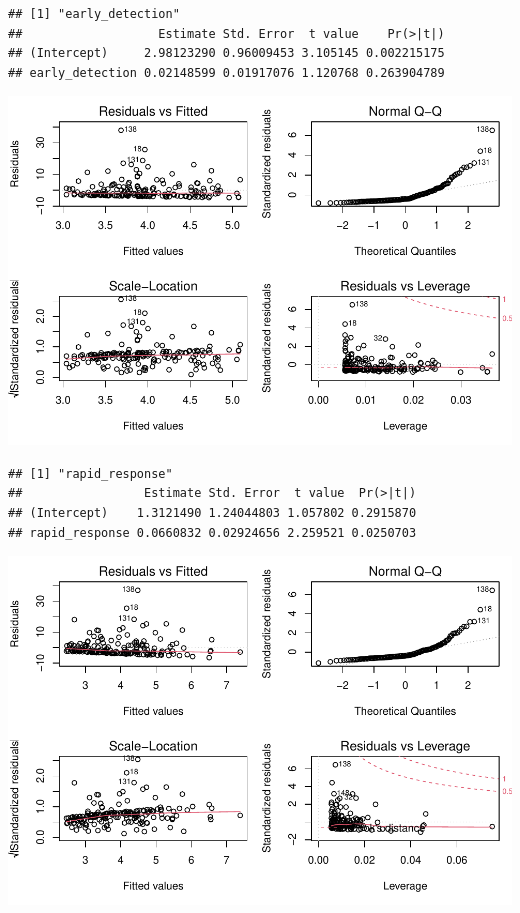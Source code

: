\documentclass[
]{article}
\begin{document}
\begin{verbatim}
## [1] "early_detection"
##                   Estimate Std. Error  t value    Pr(>|t|)
## (Intercept)     2.98123290 0.96009453 3.105145 0.002215175
## early_detection 0.02148599 0.01917076 1.120768 0.263904789
\end{verbatim}

\includegraphics{Basic-Regression_files/figure-latex/unnamed-chunk-4-2.pdf}

\begin{verbatim}
## [1] "rapid_response"
##                 Estimate Std. Error  t value  Pr(>|t|)
## (Intercept)    1.3121490 1.24044803 1.057802 0.2915870
## rapid_response 0.0660832 0.02924656 2.259521 0.0250703
\end{verbatim}

\includegraphics{Basic-Regression_files/figure-latex/unnamed-chunk-4-3.pdf}
\end{document}
